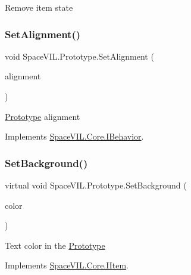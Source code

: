 Remove item state 

\mbox{\label{class_space_v_i_l_1_1_prototype_ac9d6f8cfbc2716ee740a8a21eaff33a8}} 
\subsubsection{\texorpdfstring{Set\+Alignment()}{SetAlignment()}}
{\footnotesize\ttfamily void Space\+V\+I\+L.\+Prototype.\+Set\+Alignment (\begin{DoxyParamCaption}\item[{Item\+Alignment}]{alignment }\end{DoxyParamCaption})}



\mbox{\hyperlink{class_space_v_i_l_1_1_prototype}{Prototype}} alignment 



Implements \mbox{\hyperlink{interface_space_v_i_l_1_1_core_1_1_i_behavior}{Space\+V\+I\+L.\+Core.\+I\+Behavior}}.

\mbox{\label{class_space_v_i_l_1_1_prototype_aa35761db5812bd6125ab380ad38b9a46}} 
\subsubsection{\texorpdfstring{Set\+Background()}{SetBackground()}}
{\footnotesize\ttfamily virtual void Space\+V\+I\+L.\+Prototype.\+Set\+Background (\begin{DoxyParamCaption}\item[{Color}]{color }\end{DoxyParamCaption})\hspace{0.3cm}{\ttfamily [virtual]}}



Text color in the \mbox{\hyperlink{class_space_v_i_l_1_1_prototype}{Prototype}} 



Implements \mbox{\hyperlink{interface_space_v_i_l_1_1_core_1_1_i_item}{Space\+V\+I\+L.\+Core.\+I\+Item}}.

